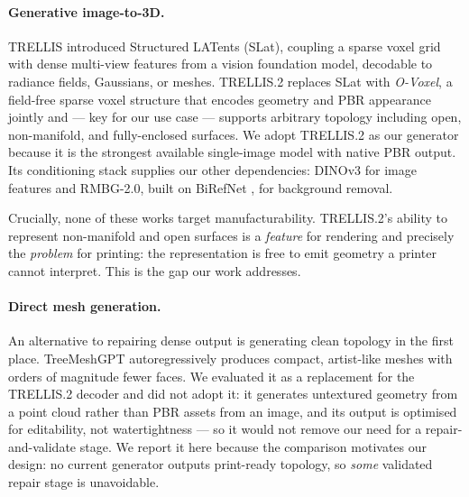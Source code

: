 \documentclass[11pt,a4paper]{article}
\begin{document}
\paragraph{Generative image-to-3D.}
TRELLIS \cite{xiang2025trellis} introduced Structured LATents (SLat), coupling
a sparse voxel grid with dense multi-view features from a vision foundation
model, decodable to radiance fields, Gaussians, or meshes. TRELLIS.2
\cite{xiang2025trellis2} replaces SLat with \emph{O-Voxel}, a field-free sparse
voxel structure that encodes geometry and PBR appearance jointly and --- key
for our use case --- supports arbitrary topology including open, non-manifold,
and fully-enclosed surfaces. We adopt TRELLIS.2 as our generator because it is
the strongest available single-image model with native PBR output. Its
conditioning stack supplies our other dependencies: DINOv3
\cite{simeoni2025dinov3} for image features and RMBG-2.0, built on BiRefNet
\cite{zheng2024birefnet}, for background removal.

Crucially, none of these works target manufacturability. TRELLIS.2's ability to
represent non-manifold and open surfaces is a \emph{feature} for rendering and
precisely the \emph{problem} for printing: the representation is free to emit
geometry a printer cannot interpret. This is the gap our work addresses.

\paragraph{Direct mesh generation.}
An alternative to repairing dense output is generating clean topology in the
first place. TreeMeshGPT \cite{lionar2025treemeshgpt} autoregressively produces
compact, artist-like meshes with orders of magnitude fewer faces. We evaluated
it as a replacement for the TRELLIS.2 decoder and did not adopt it: it
generates untextured geometry from a point cloud rather than PBR assets from an
image, and its output is optimised for editability, not watertightness --- so
it would not remove our need for a repair-and-validate stage. We report it here
because the comparison motivates our design: no current generator outputs
print-ready topology, so \emph{some} validated repair stage is unavoidable.
\end{document}
